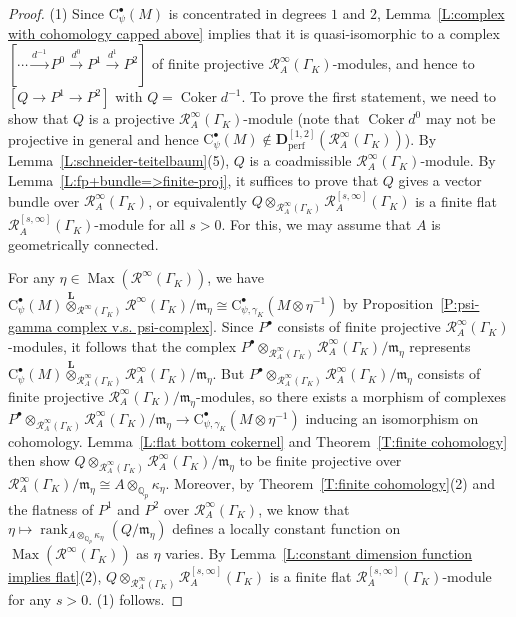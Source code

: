 \documentclass[12pt]{article}
\theoremstyle{definition}
\numberwithin{equation}{theorem}
\newcommand{\calR}{\mathcal{R}}
\newcommand{\gothm}{\mathfrak{m}}
\newcommand{\QQ}{\mathbb{Q}}
\newcommand{\bbD}{\mathbf{D}}
\newcommand{\bbL}{\mathbf{L}}
\newcommand{\rmC}{\mathrm{C}}
\newcommand{\perf}{\mathrm{perf}}
\def\Qp{\QQ_p}
\DeclareMathOperator{\Coker}{Coker}
\DeclareMathOperator{\Max}{Max}
\DeclareMathOperator{\rank}{rank}
\begin{document}
\begin{proof}
(1)
Since $\rmC^\bullet_\psi(M)$ is concentrated in degrees $1$ and $2$, Lemma~\ref{L:complex with cohomology capped above} implies that it is quasi-isomorphic to a complex $[\cdots \xrightarrow{d^{-1}} P^0 \xrightarrow{d^0} P^1 \xrightarrow{d^1} P^2 ]$ of finite projective $\calR_A^\infty(\Gamma_K)$-modules, and hence to $[Q \to P^1 \to P^2]$ with $Q = \Coker d^{-1}$.
To prove the first statement, we need to show that $Q$ is a projective $\calR_A^\infty(\Gamma_K)$-module (note that $\Coker d^0$ may not be projective in general and hence $\rmC^\bullet_\psi(M) \notin \bbD_\perf^{[1,2]} (\calR_A^\infty(\Gamma_K))$). By Lemma~\ref{L:schneider-teitelbaum}(5), $Q$ is a coadmissible $\calR_A^\infty(\Gamma_K)$-module. By 
Lemma~\ref{L:fp+bundle=>finite-proj}, it suffices to prove that $Q$ gives a vector bundle over $\calR_A^\infty(\Gamma_K)$, or equivalently $Q \otimes_{\calR_A^\infty(\Gamma_K)} \calR_A^{[s, \infty]}(\Gamma_K)$ is a finite flat $\calR_A^{[s, \infty]}(\Gamma_K)$-module for all $s>0$.  For this, we may assume that $A$ is geometrically connected.

For any $\eta \in \Max(\calR^\infty(\Gamma_K))$, we have
$\rmC^\bullet_\psi(M) \stackrel{\bbL}\otimes_{\calR^\infty(\Gamma_K)}
\calR^\infty(\Gamma_K)/\gothm_\eta \cong \rmC^\bullet_{\psi,
  \gamma_K}(M \otimes \eta^{-1})$ by Proposition~\ref{P:psi-gamma
  complex v.s. psi-complex}.  Since $P^\bullet$ consists of finite
projective $\calR_A^\infty(\Gamma_K)$-modules, it follows that the
complex $P^\bullet \otimes_{\calR_A^\infty(\Gamma_K)}
\calR_A^\infty(\Gamma_K)/\gothm_\eta$ represents $\rmC_\psi^\bullet(M)
\stackrel{\bbL}\otimes_{\calR_A^\infty(\Gamma_K)}
\calR_A^\infty(\Gamma_K)/\gothm_\eta$.  But $P^\bullet
\otimes_{\calR_A^\infty(\Gamma_K)}
\calR_A^\infty(\Gamma_K)/\gothm_\eta$ consists of finite projective
$\calR_A^\infty(\Gamma_K)/\gothm_\eta$-modules, so there exists a
morphism of complexes $P^\bullet \otimes_{\calR_A^\infty(\Gamma_K)}
\calR_A^\infty(\Gamma_K)/\gothm_\eta \to
\rmC^\bullet_{\psi,\gamma_K}(M \otimes \eta^{-1})$ inducing an
isomorphism on cohomology.  Lemma~\ref{L:flat bottom cokernel} and
Theorem~\ref{T:finite cohomology} then show $Q
\otimes_{\calR_A^\infty(\Gamma_K)}
\calR_A^\infty(\Gamma_K)/\gothm_\eta$ to be finite projective over
$\calR_A^\infty(\Gamma_K)/\gothm_\eta \cong A \otimes_{\Qp}
\kappa_\eta$.  Moreover, by Theorem~\ref{T:finite cohomology}(2) and
the flatness of $P^1$ and $P^2$ over $\calR_A^\infty(\Gamma_K)$, we
know that $\eta \mapsto \rank_{A \otimes_{\Qp} \kappa_\eta} (Q /
\gothm_\eta)$ defines a locally constant function on
$\Max(\calR^\infty(\Gamma_K))$ as $\eta$ varies.  By
Lemma~\ref{L:constant dimension function implies flat}(2), $Q
\otimes_{\calR_A^\infty(\Gamma_K)} \calR_A^{[s, \infty]}(\Gamma_K)$ is
a finite flat $\calR_A^{[s, \infty]}(\Gamma_K)$-module for any $s>0$.
(1) follows.


\end{proof}
\end{document}
